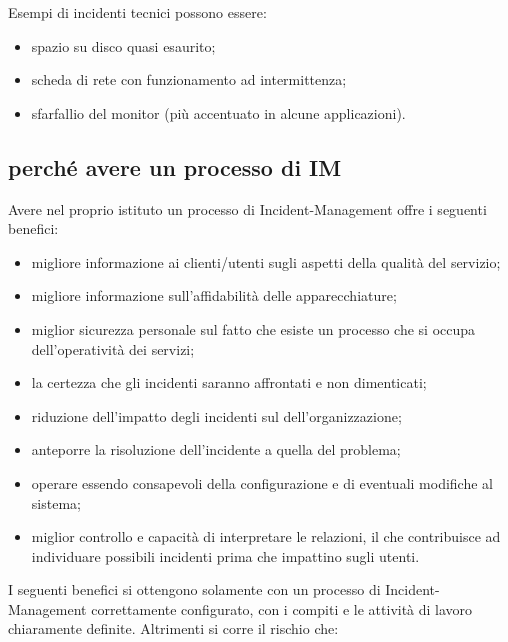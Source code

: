 Esempi di incidenti tecnici possono essere:

\begin{itemize}
\item{spazio su disco quasi esaurito;}
\item{scheda di rete con funzionamento ad intermittenza;}
\item{sfarfallio del monitor (più accentuato in alcune applicazioni).}
\end{itemize}

\subsection[Perché avere un processo di IM]{perché avere un processo di IM}
\label{prc-why-im-process}
Avere nel proprio istituto un processo di \ac{Incident-Management} offre i seguenti benefici:

\begin{itemize}
\item{migliore informazione ai clienti/utenti sugli aspetti della qualità del servizio;}
\item{migliore informazione sull'affidabilità delle apparecchiature;}
\item{miglior sicurezza personale sul fatto che esiste un processo che si occupa dell'operatività dei servizi;}
\item{la certezza che gli incidenti saranno affrontati e non dimenticati;}
\item{riduzione dell'impatto degli incidenti sul  dell'organizzazione;}
\item{anteporre la risoluzione dell'incidente a quella del problema;}
\item{operare essendo consapevoli della configurazione e di eventuali modifiche al sistema;}
\item{miglior controllo e capacità di interpretare le relazioni, il che contribuisce ad individuare possibili incidenti prima che impattino sugli utenti.}
\end{itemize}

I seguenti benefici si ottengono solamente con un processo di \ac{Incident-Management} correttamente configurato, con i compiti e le attività di lavoro chiaramente definite. Altrimenti si corre il rischio che:

